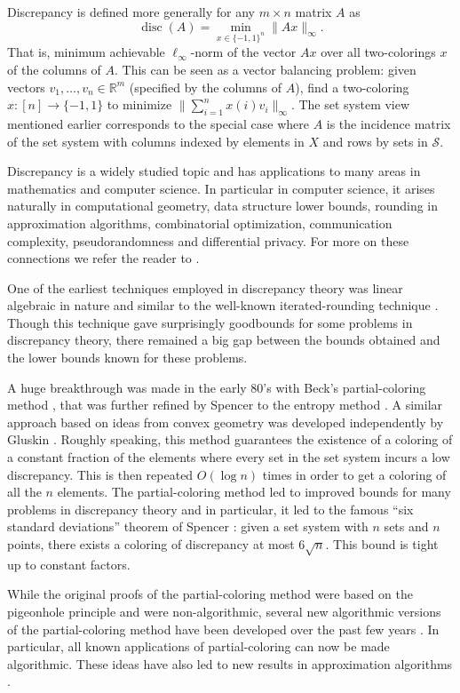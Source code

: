 \documentclass{toc}
\DeclareMathOperator{\disc}{disc}   %
\begin{document}
Discrepancy is defined more generally for any $m\times n$ matrix $A$ as
\[ \disc(A) = \min_{x\in\{- 1,1\}^n} \| Ax\|_{\infty}.\]
That is, minimum achievable $\ell_{\infty}$-norm of the vector $Ax$ over all two-colorings $x$ of the columns of $A$. This can be seen as a vector balancing problem: given vectors $v_1,\dots,v_n \in\mathbb{R}^m$ (specified by the columns of $A$), find a two-coloring $x: [n]\rightarrow \{-1,1\}$ to minimize $\| \sum_{i=1}^n x(i) v_i \|_{\infty}$. The set system view mentioned earlier corresponds to the special case where $A$ is the incidence matrix of the set system with columns indexed by elements in $X$ and rows by sets in $\mathcal{S}$.

Discrepancy is a widely studied topic and has applications to many areas in mathematics and computer science.
In particular in computer science, it arises naturally in computational geometry, data structure lower bounds, rounding in approximation algorithms, combinatorial optimization, communication complexity, pseudorandomness and differential privacy. For more on these connections we refer the reader to \cite{Chazelle,Mat09,Sashothesis}.

One of the earliest techniques employed in discrepancy
theory  %
was linear algebraic in nature and similar to the well-known iterated-rounding technique \cite{B08,BF81,LRSbook}. Though this technique gave surprisingly goodbounds for some problems in discrepancy
theory,  %
there remained a big gap between the bounds obtained and the lower bounds known for these problems. 

A huge breakthrough was made in the early 80's with Beck's partial-coloring method \cite{Beck81b}, that was further refined by Spencer to the entropy method \cite{Spencer85}. A similar approach based on ideas from convex geometry was developed independently by Gluskin \cite{Glu89}. Roughly speaking, this method guarantees the existence of a coloring of a constant fraction of the elements where every set in the set system incurs a low discrepancy. This is then repeated $O(\log n)$ times in order to get a coloring of all the $n$ elements. The partial-coloring method led to improved bounds for many problems in discrepancy
theory  %
and in particular, it led to the famous ``six standard deviations'' theorem of Spencer \cite{Spencer85}: given a set system with $n$ sets and $n$ points, there exists a coloring of discrepancy at most $6\sqrt{n}$. This bound is tight up to constant factors.

While the original proofs of the partial-coloring method were based on the pigeonhole principle and were non-algorithmic, several new algorithmic versions of the partial-coloring method have been developed over the past few years \cite{B10,LM12,Rot14,HSS14,ES14}. In particular, all known applications of partial-coloring \cite{Spencer85,Mat09} can now be made algorithmic. These ideas have also led to new results in approximation algorithms \cite{R13,BCKL14,BN15,NTZ13}.
\end{document}
